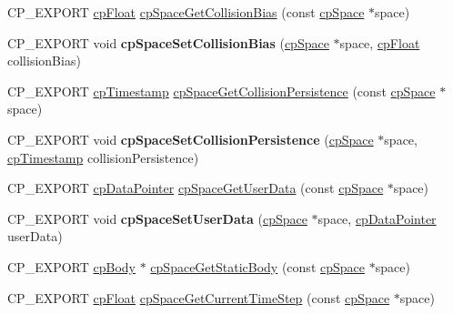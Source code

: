 \begin{DoxyCompactItemize}
\item 
C\+P\+\_\+\+E\+X\+P\+O\+RT \mbox{\hyperlink{group__basic_types_gac1ed65573e035bf892505768c852d8d3}{cp\+Float}} \mbox{\hyperlink{group__cp_space_ga53b093e1cbb978e00faf9216e1f9ab4f}{cp\+Space\+Get\+Collision\+Bias}} (const \mbox{\hyperlink{structcp_space}{cp\+Space}} $\ast$space)
\item 
\mbox{\label{group__cp_space_ga46bf525e4d6c7eb83a5222e118168c60}} 
C\+P\+\_\+\+E\+X\+P\+O\+RT void {\bfseries cp\+Space\+Set\+Collision\+Bias} (\mbox{\hyperlink{structcp_space}{cp\+Space}} $\ast$space, \mbox{\hyperlink{group__basic_types_gac1ed65573e035bf892505768c852d8d3}{cp\+Float}} collision\+Bias)
\item 
C\+P\+\_\+\+E\+X\+P\+O\+RT \mbox{\hyperlink{group__basic_types_gaa24652c104082d0725066ea5ac7dc83f}{cp\+Timestamp}} \mbox{\hyperlink{group__cp_space_gac20dad9f3ef05f468773db3d7667c9ba}{cp\+Space\+Get\+Collision\+Persistence}} (const \mbox{\hyperlink{structcp_space}{cp\+Space}} $\ast$space)
\item 
\mbox{\label{group__cp_space_ga49cd660a485d0d963f66f8333b2da788}} 
C\+P\+\_\+\+E\+X\+P\+O\+RT void {\bfseries cp\+Space\+Set\+Collision\+Persistence} (\mbox{\hyperlink{structcp_space}{cp\+Space}} $\ast$space, \mbox{\hyperlink{group__basic_types_gaa24652c104082d0725066ea5ac7dc83f}{cp\+Timestamp}} collision\+Persistence)
\item 
C\+P\+\_\+\+E\+X\+P\+O\+RT \mbox{\hyperlink{group__basic_types_ga2ac2c3c31e21893941f9e4f8ee279447}{cp\+Data\+Pointer}} \mbox{\hyperlink{group__cp_space_ga20f6bbc8db7698065052f4502050dc52}{cp\+Space\+Get\+User\+Data}} (const \mbox{\hyperlink{structcp_space}{cp\+Space}} $\ast$space)
\item 
\mbox{\label{group__cp_space_ga510319d0cc108e33cc5ee8b9cc39d449}} 
C\+P\+\_\+\+E\+X\+P\+O\+RT void {\bfseries cp\+Space\+Set\+User\+Data} (\mbox{\hyperlink{structcp_space}{cp\+Space}} $\ast$space, \mbox{\hyperlink{group__basic_types_ga2ac2c3c31e21893941f9e4f8ee279447}{cp\+Data\+Pointer}} user\+Data)
\item 
C\+P\+\_\+\+E\+X\+P\+O\+RT \mbox{\hyperlink{structcp_body}{cp\+Body}} $\ast$ \mbox{\hyperlink{group__cp_space_ga7be14c417e01cd5c17561dd176bf93e1}{cp\+Space\+Get\+Static\+Body}} (const \mbox{\hyperlink{structcp_space}{cp\+Space}} $\ast$space)
\item 
C\+P\+\_\+\+E\+X\+P\+O\+RT \mbox{\hyperlink{group__basic_types_gac1ed65573e035bf892505768c852d8d3}{cp\+Float}} \mbox{\hyperlink{group__cp_space_gad4819cd09e4590b60eea6b6dc8b4cf80}{cp\+Space\+Get\+Current\+Time\+Step}} (const \mbox{\hyperlink{structcp_space}{cp\+Space}} $\ast$space)

\end{DoxyCompactItemize}
